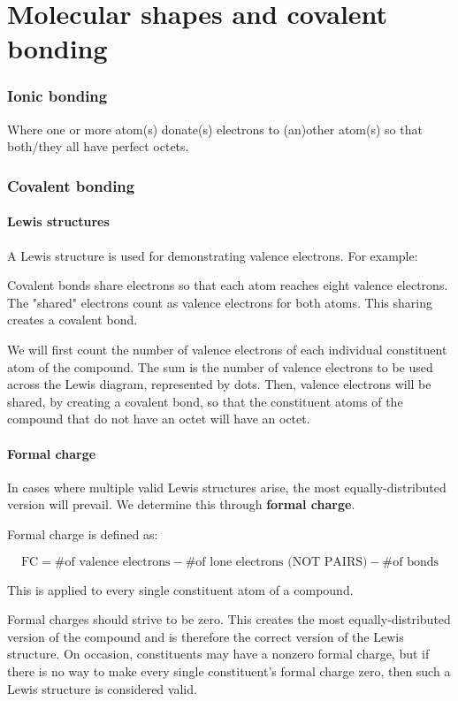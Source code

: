 \documentclass[letterpaper, 12pt]{article}
\begin{document}
\clearpage

\part{Molecular shapes and covalent bonding}

\section{Ionic bonding}
Where one or more atom(s) donate(s) electrons to (an)other atom(s) so that both/they all have perfect octets.

\section{Covalent bonding}

	\subsection{Lewis structures}
	A Lewis structure is used for demonstrating valence electrons. For example:


	Covalent bonds share electrons so that each atom reaches eight valence electrons. The "shared" electrons count as valence electrons for both atoms. This sharing creates a covalent bond.

	We will first count the number of valence electrons of each individual constituent atom of the compound. The sum is the number of valence electrons to be used across the Lewis diagram, represented by dots. Then, valence electrons will be shared, by creating a covalent bond, so that the constituent atoms of the compound that do not have an octet will have an octet.

	\subsection{Formal charge}
	In cases where multiple valid Lewis structures arise, the most equally-distributed version will prevail. We determine this through \textbf{formal charge}.
	
	Formal charge is defined as:
	
	$$\text{FC} = \text{\# of valence electrons} - \text{\# of lone electrons (NOT PAIRS)} - \text{\# of bonds}$$
	
	This is applied to every single constituent atom of a compound.
	
	Formal charges should strive to be zero. This creates the most equally-distributed version of the compound and is therefore the correct version of the Lewis structure. On occasion, constituents may have a nonzero formal charge, but if there is no way to make every single constituent's formal charge zero, then such a Lewis structure is considered valid.\\
	
\end{document}
